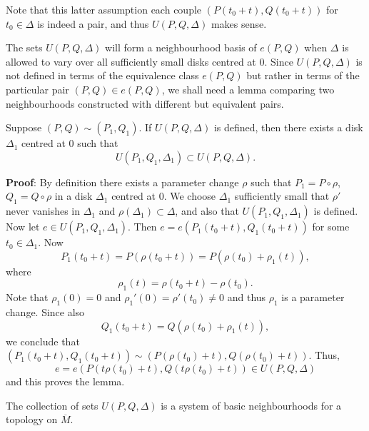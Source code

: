\documentclass[a4paper,11pt]{article}
\begin{document}
Note that this latter assumption each couple $(P(t_0+t),Q(t_0+t))$ for
$t_0 \in \Delta$ is indeed a pair, and thus $U(P,Q,\Delta)$ makes
sense.

The sets $U(P,Q,\Delta)$ will form a neighbourhood basis of $e(P,Q)$
when $\Delta$ is allowed to vary over all sufficiently small disks
centred at 0.  Since $U(P,Q,\Delta)$ is not defined in terms of the
equivalence class $e(P,Q)$ but rather in terms of the particular pair
$(P, Q) \in e(P,Q)$, we shall need a lemma comparing two
neighbourhoods constructed with different but equivalent pairs.

\begin{lem}
  \label{lem:2}
  Suppose $(P,Q) \sim (P_1,Q_1)$.  If $U(P,Q,\Delta)$ is defined, then
  there exists a disk $\Delta_1$ centred at 0 such that
  $$
  U(P_1,Q_1,\Delta_1) \subset U(P,Q,\Delta).
  $$
\end{lem}

\begin{mdframed}
  \textbf{Proof}: By definition there exists a parameter change $\rho$
  such that $P_1 = P \circ \rho$, $Q_1 = Q\circ \rho$ in a disk
  $\Delta_1$ centred at 0.  We choose $\Delta_1$ sufficiently small
  that $\rho'$ never vanishes in $\Delta_1$ and $\rho(\Delta_1)
  \subset \Delta$, and also that $U(P_1,Q_1, \Delta_1)$ is defined.
  Now let $e \in U(P_1,Q_1,\Delta_1)$.  Then $e = e(P_1(t_0 + t),
  Q_1(t_0 + t))$ for some $t_0 \in \Delta_1$.  Now
  $$
  P_1(t_0 + t) = P(\rho(t_0 + t)) = P(\rho(t_0) + \rho_1(t)),
  $$
  where
  $$
  \rho_1(t) = \rho(t_0+t) - \rho(t_0).
  $$
  Note that $\rho_1(0) = 0$ and $\rho_1'(0) = \rho'(t_0) \ne 0$ and
  thus $\rho_1$ is a parameter change.  Since also
  $$
  Q_1(t_0 + t) = Q(\rho(t_0) + \rho_1(t)),
  $$
  we conclude that $(P_1(t_0 + t), Q_1(t_0 + t)) \sim
  (P(\rho(t_0) + t), Q(\rho(t_0) + t))$.  Thus,
  $$
  e = e(P(t\rho(t_0) + t), Q(t\rho(t_0) + t)) \in U(P,Q,\Delta)
  $$
  and this proves the lemma.
\end{mdframed}

\begin{propn}
  \label{propn:1}
  The collection of sets $U(P,Q,\Delta)$ is a system of basic
  neighbourhoods for a topology on $\overline{M}$.
\end{propn}
\end{document}
